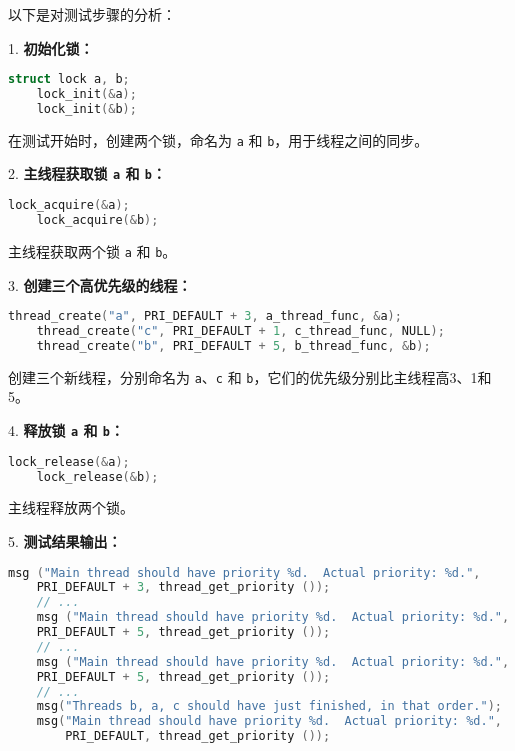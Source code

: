 \documentclass{beamer}
\begin{document}
\begin{frame}



  \framebreak

  以下是对测试步骤的分析：

  1. \textbf{初始化锁：}
  \begin{lstlisting}[language=C]
    struct lock a, b;
    lock_init(&a);
    lock_init(&b);
\end{lstlisting}

  在测试开始时，创建两个锁，命名为 \texttt{a} 和 \texttt{b}，用于线程之间的同步。

  2. \textbf{主线程获取锁 \texttt{a} 和 \texttt{b}：}
  \begin{lstlisting}[language=C]
    lock_acquire(&a);
    lock_acquire(&b);
\end{lstlisting}

  主线程获取两个锁 \texttt{a} 和 \texttt{b}。

  3. \textbf{创建三个高优先级的线程：}
  \begin{lstlisting}[language=C]
    thread_create("a", PRI_DEFAULT + 3, a_thread_func, &a);
    thread_create("c", PRI_DEFAULT + 1, c_thread_func, NULL);
    thread_create("b", PRI_DEFAULT + 5, b_thread_func, &b);
\end{lstlisting}

  创建三个新线程，分别命名为 \texttt{a}、\texttt{c} 和 \texttt{b}，它们的优先级分别比主线程高3、1和5。

  4. \textbf{释放锁 \texttt{a} 和 \texttt{b}：}
  \begin{lstlisting}[language=C]
    lock_release(&a);
    lock_release(&b);
\end{lstlisting}

  主线程释放两个锁。

  5. \textbf{测试结果输出：}
  \begin{lstlisting}[language=C]
    msg ("Main thread should have priority %d.  Actual priority: %d.",
    PRI_DEFAULT + 3, thread_get_priority ());
    // ...
    msg ("Main thread should have priority %d.  Actual priority: %d.",
    PRI_DEFAULT + 5, thread_get_priority ());
    // ...
    msg ("Main thread should have priority %d.  Actual priority: %d.",
    PRI_DEFAULT + 5, thread_get_priority ());
    // ...
    msg("Threads b, a, c should have just finished, in that order.");
    msg("Main thread should have priority %d.  Actual priority: %d.",
        PRI_DEFAULT, thread_get_priority ());
\end{lstlisting}


\end{frame}
\end{document}
